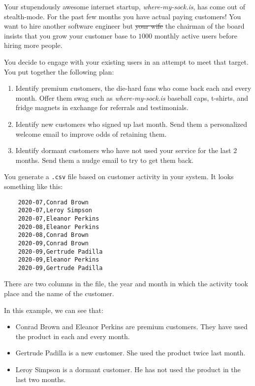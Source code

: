 

Your stupendously awesome internet startup, \emph{where-my-sock.is}, has come out of stealth-mode.
For the past few months you have actual paying customers!
You want to hire another software engineer but \sout{your wife} the chairman of the board
insists that you grow your customer base to $1000$ monthly active users before hiring more people.

You decide to engage with your existing users in an attempt to meet that target. You put together the following plan:
\begin{enumerate}
    \item Identify premium customers, the die-hard fans who come back each and every month. 
        Offer them swag such as \emph{where-my-sock.is} baseball caps, t-shirts, and fridge magnets in exchange for referrals and testimonials.
    \item Identify new customers who signed up last month. Send them a personalized welcome email to improve odds of retaining them.
    \item Identify dormant customers who have not used your service for the last 2 months. Send them a nudge email to try to get them back.
\end{enumerate}
You generate a \texttt{.csv} file based on customer activity in your system. It looks something like this:
\begin{verbatim}
    2020-07,Conrad Brown
    2020-07,Leroy Simpson
    2020-07,Eleanor Perkins
    2020-08,Eleanor Perkins
    2020-08,Conrad Brown
    2020-09,Conrad Brown
    2020-09,Gertrude Padilla
    2020-09,Eleanor Perkins
    2020-09,Gertrude Padilla
\end{verbatim}
There are two columns in the file, the year and month in which the activity took place and the name of the customer.

In this example, we can see that:
\begin{itemize}
    \item Conrad Brown and Eleanor Perkins are premium customers. They have used the product in each and every month.
    \item Gertrude Padilla is a new customer. She used the product twice last month.
    \item Leroy Simpson is a dormant customer. He has not used the product in the last two months.
\end{itemize}

